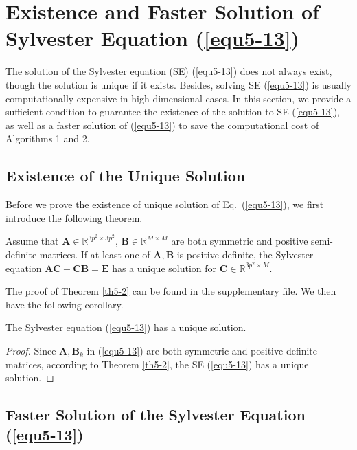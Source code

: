 \section{Existence and Faster Solution of Sylvester Equation (\ref{equ5-13})}


The solution of the Sylvester equation (SE) (\ref{equ5-13}) does not always exist, though the solution is unique if it exists. Besides, solving SE (\ref{equ5-13}) is usually computationally expensive in high dimensional cases. In this section, we provide a sufficient condition to guarantee the existence of the solution to SE (\ref{equ5-13}), as well as a faster solution of (\ref{equ5-13}) to save the computational cost of Algorithms 1 and 2. 


\subsection{Existence of the Unique Solution}

Before we prove the existence of unique solution of Eq.\ (\ref{equ5-13}), we first introduce the following theorem. 

\begin{theorem}
\label{th5-2}
Assume that $\bm{A}\in\mathbb{R}^{3p^2\times 3p^2}$, $\bm{B}\in\mathbb{R}^{M\times M}$ are both symmetric and positive semi-definite matrices. If at least one of $\bm{A}, \bm{B}$ is positive definite, the Sylvester equation $\bm{A}\bm{C}
+
\bm{C}\bm{B}
=
\bm{E}$ has a unique solution for $\bm{C}\in \mathbb{R}^{3p^2\times M}$.
\end{theorem}

The proof of Theorem \ref{th5-2} can be found in the supplementary file. We then have the following corollary.

\begin{corollary}
The Sylvester equation (\ref{equ5-13}) has a unique solution.
\end{corollary}

\begin{proof}
Since $\bm{A},\bm{B}_{k}$ in (\ref{equ5-13}) are both symmetric and positive definite matrices, according to Theorem \ref{th5-2}, the SE (\ref{equ5-13}) has a unique solution. 
\end{proof}


\subsection{Faster Solution of the Sylvester Equation (\ref{equ5-13})}

